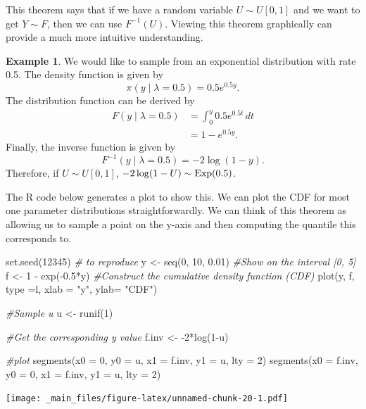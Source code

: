 \documentclass[
]{book}
\newenvironment{Shaded}{\begin{snugshade}}{\end{snugshade}}
\newcommand{\AttributeTok}[1]{\textcolor[rgb]{0.77,0.63,0.00}{#1}}
\newcommand{\CommentTok}[1]{\textcolor[rgb]{0.56,0.35,0.01}{\textit{#1}}}
\newcommand{\DecValTok}[1]{\textcolor[rgb]{0.00,0.00,0.81}{#1}}
\newcommand{\FloatTok}[1]{\textcolor[rgb]{0.00,0.00,0.81}{#1}}
\newcommand{\FunctionTok}[1]{\textcolor[rgb]{0.00,0.00,0.00}{#1}}
\newcommand{\NormalTok}[1]{#1}
\newcommand{\OtherTok}[1]{\textcolor[rgb]{0.56,0.35,0.01}{#1}}
\newcommand{\SpecialCharTok}[1]{\textcolor[rgb]{0.00,0.00,0.00}{#1}}
\newcommand{\StringTok}[1]{\textcolor[rgb]{0.31,0.60,0.02}{#1}}
\theoremstyle{definition}
\theoremstyle{definition}
\newtheorem{example}{Example}[chapter]
\theoremstyle{definition}
\theoremstyle{definition}
\theoremstyle{remark}
\begin{document}
This theorem says that if we have a random variable \(U \sim U[0, 1]\) and we want to get \(Y \sim F\), then we can use \(F^{-1}(U)\). Viewing this theorem graphically can provide a much more intuitive understanding.

\begin{example}
We would like to sample from an exponential distribution with rate 0.5. The density function is given by
\[
\pi(y \mid \lambda = 0.5) = 0.5e^{0.5y}.
\]
The distribution function can be derived by
\begin{align*}
F(y \mid \lambda = 0.5) &= \int_0^y 0.5e^{0.5t}\,dt \\
& =  1 - e^{0.5y}.
\end{align*}
Finally, the inverse function is given by
\[
F^{-1}(y \mid \lambda = 0.5) = -2\log(1-y).  
\]
Therefore, if \(U \sim U[0, 1]\), \(-2\log(1-U) \sim \hbox{Exp}(0.5)\).

The R code below generates a plot to show this. We can plot the CDF for most one parameter distributions straightforwardly. We can think of this theorem as allowing us to sample a point on the y-axis and then computing the quantile this corresponds to.

\begin{Shaded}
\begin{Highlighting}[]
\FunctionTok{set.seed}\NormalTok{(}\DecValTok{12345}\NormalTok{) }\CommentTok{\# to reproduce}
\NormalTok{y }\OtherTok{\textless{}{-}} \FunctionTok{seq}\NormalTok{(}\DecValTok{0}\NormalTok{, }\DecValTok{10}\NormalTok{, }\FloatTok{0.01}\NormalTok{) }\CommentTok{\#Show on the interval [0, 5]}
\NormalTok{f }\OtherTok{\textless{}{-}} \DecValTok{1} \SpecialCharTok{{-}} \FunctionTok{exp}\NormalTok{(}\SpecialCharTok{{-}}\FloatTok{0.5}\SpecialCharTok{*}\NormalTok{y)    }\CommentTok{\#Construct the cumulative density function (CDF)}
\FunctionTok{plot}\NormalTok{(y, f, }\AttributeTok{type =}\StringTok{\textquotesingle{}l\textquotesingle{}}\NormalTok{, }\AttributeTok{xlab =} \StringTok{"y"}\NormalTok{, }\AttributeTok{ylab=} \StringTok{"CDF"}\NormalTok{)}

\CommentTok{\#Sample u}
\NormalTok{u }\OtherTok{\textless{}{-}} \FunctionTok{runif}\NormalTok{(}\DecValTok{1}\NormalTok{)}

\CommentTok{\#Get the corresponding y value}
\NormalTok{f.inv }\OtherTok{\textless{}{-}} \SpecialCharTok{{-}}\DecValTok{2}\SpecialCharTok{*}\FunctionTok{log}\NormalTok{(}\DecValTok{1}\SpecialCharTok{{-}}\NormalTok{u)}

\CommentTok{\#plot }
\FunctionTok{segments}\NormalTok{(}\AttributeTok{x0 =} \DecValTok{0}\NormalTok{, }\AttributeTok{y0 =}\NormalTok{ u, }\AttributeTok{x1 =}\NormalTok{ f.inv, }\AttributeTok{y1 =}\NormalTok{ u, }\AttributeTok{lty =} \DecValTok{2}\NormalTok{)}
\FunctionTok{segments}\NormalTok{(}\AttributeTok{x0 =}\NormalTok{ f.inv, }\AttributeTok{y0 =} \DecValTok{0}\NormalTok{, }\AttributeTok{x1 =}\NormalTok{ f.inv, }\AttributeTok{y1 =}\NormalTok{ u, }\AttributeTok{lty =} \DecValTok{2}\NormalTok{)}
\end{Highlighting}
\end{Shaded}

\texttt{[image: \_main\_files/figure-latex/unnamed-chunk-20-1.pdf]}
\end{example}
\end{document}
